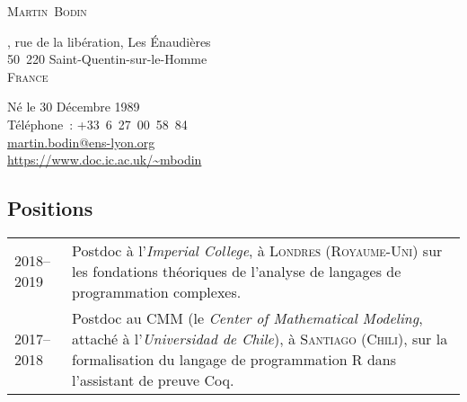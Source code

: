 \documentclass[12pt,a4paper]{article}
\makeatletter
\newcommand{\en}[1]{\foreignlanguage{english}{\textit{#1}}}
\newcommand{\es}[1]{\foreignlanguage{spanish}{\textit{#1}}}
\newcommand{\en}[1]{\foreignlanguage{english}{\textit{#1}}}
\newenvironment{datecvsection}[1]%
               {\subsection*{#1}%
                 \noindent \begin{tabular}{@{}p{\annee}p{\texte}@{}}}
               {\end{tabular}}
\makeatother
\begin{document}
\pagestyle{empty}


\newlength{\annee}
\settowidth{\annee}{9999--9999}


\newlength{\texte}
\setlength{\texte}{\textwidth} \addtolength{\texte}{-\annee} 
	\addtolength{\texte}{-2\tabcolsep}

\begin{center} \Huge \textsc{Martin~Bodin} \end{center}

\parbox[c]{.5\textwidth}
{
  , rue de la libération,
  Les Énaudières \\
  50~220 Saint-Quentin-sur-le-Homme \\
  \textsc{France}
}
\parbox[c]{.55\textwidth}
{
\begin{flushright}
  Né le 30 Décembre 1989 \\
  \noindent Téléphone~: \mbox{+33 6 27 00 58 84} \\
  \url{martin.bodin@ens-lyon.org} \\
  \url{https://www.doc.ic.ac.uk/~mbodin}
\end{flushright}
}


\begin{datecvsection}{Positions}

    2018–2019 & Postdoc à l’\en{Imperial College}, à \textsc{Londres} (\textsc{Royaume-Uni}) sur les fondations théoriques de l’analyse de langages de programmation complexes. \\

    2017–2018 & Postdoc au \textsc{CMM} (le \en{Center of Mathematical Modeling}, attaché à l’\es{Universidad de Chile}), à \textsc{Santiago} (\textsc{Chili}), sur la formalisation du langage de programmation R dans l’assistant de preuve Coq. \\

\end{datecvsection}
\end{document}
